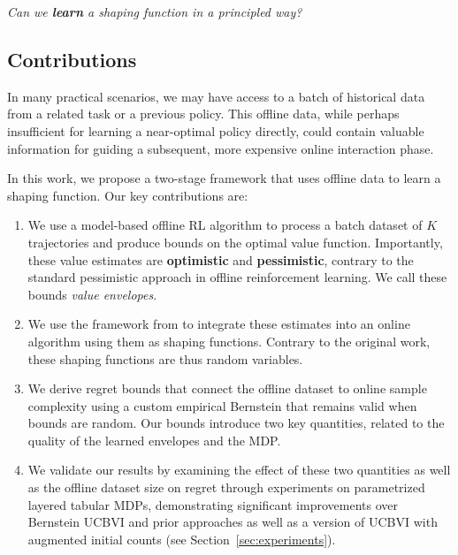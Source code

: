 \documentclass[twoside]{article}
\newcounter{notecounter}
\newcommand{\note}[2]{\refstepcounter{notecounter} \begin{leftbar}  \textcolor{red}{\textbf{#1}} \textcolor{violet}{(\textbf{Note} \thenotecounter)}: \begin{sf}{\color{blue} #2} \end{sf}  \end{leftbar}}
\newcommand{\note}[2]{}
\begin{document}


\begin{center}
    \emph{Can we \textbf{learn} a shaping function in a principled way?}\vspace{-0.2cm}
\end{center}
\subsection{Contributions}
In many practical scenarios, we may have access to a batch of historical data from a related task or a previous policy. This offline data, while perhaps insufficient for learning a near-optimal policy directly, could contain valuable information for guiding a subsequent, more expensive online interaction phase.

In this work, we propose a two-stage framework that uses offline data to learn a shaping function. Our key contributions are:
\begin{enumerate}
    \item We use a model-based offline RL algorithm to process a batch dataset of $K$ trajectories and produce bounds on the optimal value function. Importantly, these value estimates are \textbf{optimistic} and \textbf{pessimistic}, contrary to the standard pessimistic approach in offline reinforcement learning. We call these bounds \emph{value envelopes}.
    \item We use the framework from \cite{gupta_unpacking_2022} to integrate these estimates into an online algorithm using them as shaping functions. Contrary to the original work, these shaping functions are thus random variables.
    \item We derive regret bounds that connect the offline dataset to online sample complexity using a custom empirical Bernstein that remains valid when bounds are random. Our bounds introduce two key quantities, related to the quality of the learned envelopes and the MDP.
    \item We validate our results by examining the effect of these two quantities as well as the offline dataset size on regret through experiments on parametrized layered tabular MDPs, demonstrating significant improvements over Bernstein UCBVI \cite{azar_minimax_2017} and prior approaches as well as a version of UCBVI with augmented initial counts (see Section~\ref{sec:experiments}).
\end{enumerate}
\end{document}
